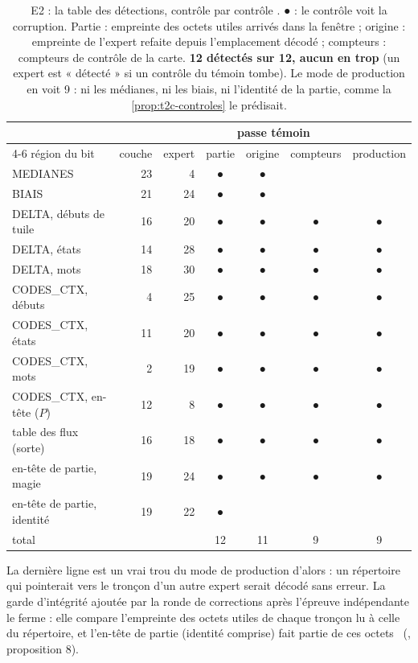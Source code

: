 \begin{table}[ht]
\centering\small
\caption[E2 : la table des détections de la cassure]{E2 : la table des détections, contrôle par contrôle \mes. ● : le contrôle voit la corruption. Partie : empreinte des octets utiles arrivés dans la fenêtre ; origine : empreinte de l'expert refaite depuis l'emplacement décodé ; compteurs : compteurs de contrôle de la carte. \textbf{12 détectés sur 12, aucun en trop} (un expert est « détecté » si un contrôle du témoin tombe). Le mode de production en voit 9 : ni les médianes, ni les biais, ni l'identité de la partie, comme la \cref{prop:t2c-controles} le prédisait.}
\label{tab:t2c-cassure}
\begin{tabular}{@{}lrrcccc@{}}
\toprule
 & & & \multicolumn{3}{c}{passe témoin} & \\
\cmidrule(lr){4-6}
région du bit & couche & expert & partie & origine & compteurs & production \\
\midrule
MEDIANES & 23 & 4 & ● & ● & & \\
BIAIS & 21 & 24 & ● & ● & & \\
DELTA, débuts de tuile & 16 & 20 & ● & ● & ● & ● \\
DELTA, états & 14 & 28 & ● & ● & ● & ● \\
DELTA, mots & 18 & 30 & ● & ● & ● & ● \\
CODES\_CTX, débuts & 4 & 25 & ● & ● & ● & ● \\
CODES\_CTX, états & 11 & 20 & ● & ● & ● & ● \\
CODES\_CTX, mots & 2 & 19 & ● & ● & ● & ● \\
CODES\_CTX, en-tête ($P$) & 12 & 8 & ● & ● & ● & ● \\
table des flux (sorte) & 16 & 18 & ● & ● & ● & ● \\
en-tête de partie, magie & 19 & 24 & ● & ● & ● & ● \\
en-tête de partie, identité & 19 & 22 & ● & & & \\
\midrule
total & & & 12 & 11 & 9 & 9 \\
\bottomrule
\end{tabular}
\end{table}

La dernière ligne est un vrai trou du mode de production d'alors : un répertoire qui pointerait vers le tronçon d'un autre expert serait décodé sans erreur. La garde d'intégrité ajoutée par la ronde de corrections après l'épreuve indépendante le ferme : elle compare l'empreinte des octets utiles de chaque tronçon lu à celle du répertoire, et l'en-tête de partie (identité comprise) fait partie de ces octets \calc~(, proposition 8).

